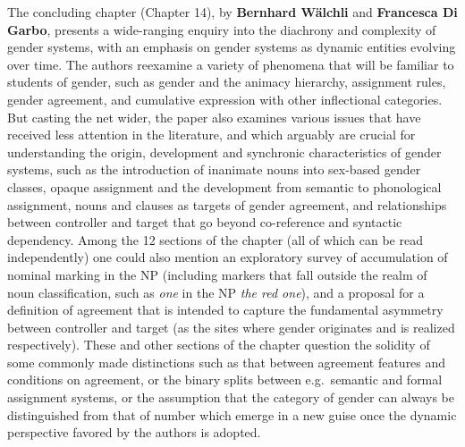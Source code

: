 \documentclass[output=collectionpaper]{langsci/langscibook}
\begin{document}
The concluding chapter (Chapter 14), by \textbf{Bernhard Wälchli} and \textbf{Francesca Di Garbo}, presents a wide-ranging enquiry into the diachrony and complexity of gender systems, with an emphasis on gender systems as dynamic entities evolving over time. The authors reexamine a variety of phenomena that will be familiar to students of gender, such as gender and the animacy hierarchy, assignment rules, gender agreement, and cumulative expression with other inflectional categories. But casting the net wider, the paper also examines various issues that have received less attention in the literature, and which arguably are crucial for understanding the origin, development and synchronic characteristics of gender systems, such as the introduction of inanimate nouns into sex-based gender classes, opaque assignment and the development from semantic to phonological assignment, nouns \textendash{} and clauses \textendash{} as targets of gender agreement, and relationships between controller and target that go beyond co-reference and syntactic dependency. Among the 12 sections of the chapter (all of which can be read independently) one could also mention an exploratory survey of accumulation of nominal marking in the NP (including markers that fall outside the realm of noun classification, such as \textit{one} in the NP \textit{the red one}), and a proposal for a definition of agreement that is intended to capture the fundamental asymmetry between controller and target (as the sites where gender originates and is realized respectively). These and other sections of the chapter question the solidity of some commonly made distinctions \textendash{} such as that between agreement features and conditions on agreement, or the binary splits between e.g.\ semantic and formal assignment systems, or the assumption that the category of gender can always be distinguished from that of number \textendash{} which emerge in a new guise once the dynamic perspective favored by the authors is adopted.

{\sloppy
\printbibliography[heading=subbibliography,notkeyword=this]
}
\end{document}
